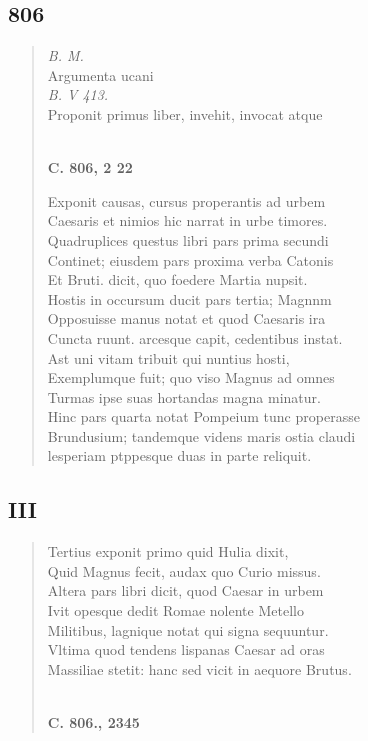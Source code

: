 \documentclass[11pt, a4paper]{report}
\begin{document}
            \subsection*{806}
      \begin{verse}
      \textit{B. M.} \\ Argumenta ucani \\ \textit{B. V 413.} \\ Proponit primus liber, invehit, invocat atque \\ 
        ﻿\pagebreak 
     \marginpar{[279]} \begin{center} \textbf{C. 806, 2 22} \end{center}Exponit causas, cursus properantis ad urbem \\ Caesaris et nimios hic narrat in urbe timores. \\ Quadruplices questus libri pars prima secundi \\ Continet; eiusdem pars proxima verba Catonis \\ Et Bruti. dicit, quo foedere Martia nupsit. \\ Hostis in occursum ducit pars tertia; Magnnm \\ Opposuisse manus notat et quod Caesaris ira \\ Cuncta ruunt. arcesque capit, cedentibus instat. \\ Ast uni vitam tribuit qui nuntius hosti, \\ Exemplumque fuit; quo viso Magnus ad omnes \\ Turmas ipse suas hortandas magna minatur. \\ Hinc pars quarta notat Pompeium tunc properasse \\ Brundusium; tandemque videns maris ostia claudi \\ lesperiam ptppesque duas in parte reliquit. \\ 
      \end{verse}
  
            \subsection*{III}
      \begin{verse}
      Tertius exponit primo quid Hulia dixit, \\ Quid Magnus fecit, audax quo Curio missus. \\ Altera pars libri dicit, quod Caesar in urbem \\ Ivit opesque dedit Romae nolente Metello \\ Militibus, lagnique notat qui signa sequuntur. \\ Vltima quod tendens lispanas Caesar ad oras \\ Massiliae stetit: hanc sed vicit in aequore Brutus. \\ 
        ﻿\pagebreak 
    \begin{center} \textbf{C. 806., 2345} \end{center} \marginpar{[280]} 
      \end{verse}
  
\end{document}
